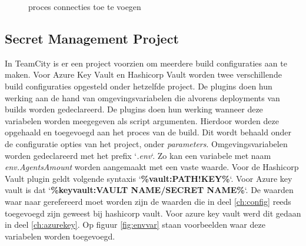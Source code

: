 \begin{figure}[!htb]
    \centering
    \caption{proces connecties toe te voegen \autocite{teamcity}}
    \label{fig:connections}
\end{figure}

\subsection{Secret Management Project}
In TeamCity is er een project voorzien om meerdere build configuraties aan te maken. Voor Azure Key Vault en Hashicorp Vault worden twee verschillende build configuraties opgesteld onder hetzelfde project. De plugins doen hun werking aan de hand van omgevingsvariabelen die alvorens deployments van builds worden gedeclareerd. De plugins doen hun werking wanneer deze variabelen worden meegegeven als script argumenten. Hierdoor worden deze opgehaald en toegevoegd aan het proces van de build. Dit wordt behaald onder de configuratie opties van het project, onder \textit{parameters}. Omgevingsvariabelen worden gedeclareerd met het prefix `\textit{.env}`. Zo kan een variabele met naam \textit{env.AgentsAmount} worden aangemaakt met een vaste waarde. Voor de Hashicorp Vault plugin geldt volgende syntaxis `\textbf{\%vault:PATH!KEY\%}`. Voor Azure key vault is dat `\textbf{\%keyvault:VAULT NAME/SECRET NAME\%}`. De waarden waar naar gerefereerd moet worden zijn de waarden die in deel \ref{ch:config} reeds toegevoegd zijn geweest bij hashicorp vault. Voor azure key vault werd dit gedaan in deel \ref{ch:azurekey}. Op figuur \ref{fig:envvar} staan voorbeelden waar deze variabelen worden toegevoegd.

